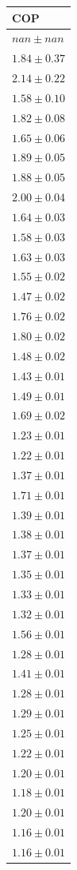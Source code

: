 \begin{tabular}{l}
\toprule
COP \\
\midrule
$nan \pm nan$ \\
$1.84 \pm 0.37$ \\
$2.14 \pm 0.22$ \\
$1.58 \pm 0.10$ \\
$1.82 \pm 0.08$ \\
$1.65 \pm 0.06$ \\
$1.89 \pm 0.05$ \\
$1.88 \pm 0.05$ \\
$2.00 \pm 0.04$ \\
$1.64 \pm 0.03$ \\
$1.58 \pm 0.03$ \\
$1.63 \pm 0.03$ \\
$1.55 \pm 0.02$ \\
$1.47 \pm 0.02$ \\
$1.76 \pm 0.02$ \\
$1.80 \pm 0.02$ \\
$1.48 \pm 0.02$ \\
$1.43 \pm 0.01$ \\
$1.49 \pm 0.01$ \\
$1.69 \pm 0.02$ \\
$1.23 \pm 0.01$ \\
$1.22 \pm 0.01$ \\
$1.37 \pm 0.01$ \\
$1.71 \pm 0.01$ \\
$1.39 \pm 0.01$ \\
$1.38 \pm 0.01$ \\
$1.37 \pm 0.01$ \\
$1.35 \pm 0.01$ \\
$1.33 \pm 0.01$ \\
$1.32 \pm 0.01$ \\
$1.56 \pm 0.01$ \\
$1.28 \pm 0.01$ \\
$1.41 \pm 0.01$ \\
$1.28 \pm 0.01$ \\
$1.29 \pm 0.01$ \\
$1.25 \pm 0.01$ \\
$1.22 \pm 0.01$ \\
$1.20 \pm 0.01$ \\
$1.18 \pm 0.01$ \\
$1.20 \pm 0.01$ \\
$1.16 \pm 0.01$ \\
$1.16 \pm 0.01$ \\

\end{tabular}
